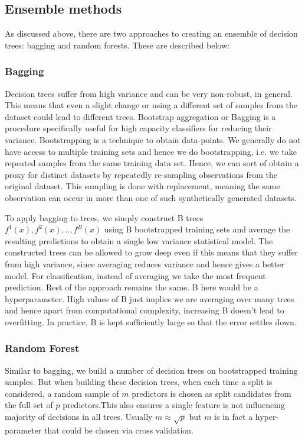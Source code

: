 \documentclass[conference]{IEEEtran}
\begin{document}
\subsection{Ensemble methods}

As discussed above, there are two approaches to creating an ensemble of decision trees: bagging and random forests. These are described below:

\subsubsection{Bagging}

Decision trees suffer from high variance and can be very non-robust, in general. This means that even a slight change or using a different set of samples from the dataset could lead to different trees. Bootstrap aggregation or Bagging is a procedure specifically useful for high capacity classifiers for reducing their variance. Bootstrapping is a technique to obtain data-points. We generally do not have access to multiple training sets and hence we do bootstrapping, i.e. we take repeated samples from the same training data set. Hence, we can sort of obtain a proxy for distinct datasets by repeatedly re-sampling observations from the original dataset. This sampling is done with replacement, meaning the same observation can occur in more than one of such synthetically generated datasets.

To apply bagging to trees, we simply construct B trees $f^1 (x), f^2 (x), .., f ^ B (x)$ using B bootstrapped training sets and average the resulting predictions to obtain a single low
variance statistical model. The constructed trees can be allowed to grow deep even if this means that they suffer from high variance, since averaging reduces variance and hence gives a better model. For classification, instead of averaging we take the most frequent prediction. Rest of the approach remains the same. B here would be a hyperparameter. High values of B just implies we are
averaging over many trees and hence apart from computational complexity, increasing B doesn't lead to overfitting. In practice, B is kept sufficiently large so that the error settles down.

\subsubsection{Random Forest}

Similar to bagging, we build a number of decision trees on bootstrapped training samples. But when building these decision trees, when each time a split is considered, a random
sample of $m$ predictors is chosen as split candidates from the full set of $p$ predictors.This also ensures a single feature is not influencing majority of decisions in all trees. Usually $m \approx \sqrt{p}$ but $m$ is in fact a hyper-parameter that could be chosen via cross validation. 
\end{document}

